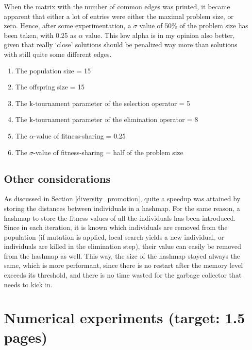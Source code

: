\documentclass[a4paper,10pt]{article}
\newcommand{\ReplaceMe}[1]{{\color{blue}#1}}
\begin{document}
When the matrix with the number of common edges was printed, it became apparent that either a lot of entries were either the maximal problem size, or zero. Hence, after some experimentation, a $\sigma$ value of 50\% of the problem size has been taken, with 0.25 as $\alpha$ value. This low alpha is in my opinion also better, given that really `close' solutions should be penalized way more than solutions with still quite some different edges.

\begin{enumerate}
    \item The population size = 15
    \item The offspring size = 15
    \item The k-tournament parameter of the selection operator = 5 
    \item The k-tournament parameter of the elimination operator = 8
    \item The $\alpha$-value of fitness-sharing = 0.25
    \item The $\sigma$-value of fitness-sharing = half of the problem size
\end{enumerate}

\subsection{Other considerations}
As discussed in Section \ref{diversity_promotion}, quite a speedup was attained by storing the distances between individuals in a hashmap. For the same reason, a hashmap to store the fitness values of all the individuals has been introduced. Since in each iteration, it is known which individuals are removed from the population (if mutation is applied, local search yields a new individual, or individuals are killed in the elimination step), their value can easily be removed from the hashmap as well. This way, the size of the hashmap stayed always the same, which is more performant, since there is no restart after the memory level exceeds its threshold, and there is no time wasted for the garbage collector that needs to kick in.



\section{Numerical experiments (target: 1.5 pages)}
\end{document}
